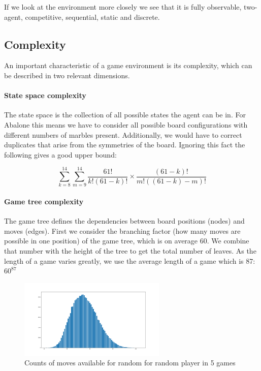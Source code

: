 \documentclass{llncs}
\begin{document}
If we look at the environment more closely we see that it is fully observable, two-agent, competitive, sequential, static and discrete.

\subsection{Complexity}
An important characteristic of a game environment is its complexity, which can be described in two relevant dimensions.

\paragraph{State space complexity}

The state space is the collection of all possible states the agent can be in.\cite[p. 150]{russell_artificial_2021} For Abalone this means we have to consider all possible board configurations with different numbers of marbles present. Additionally, we would have to correct duplicates that arise from the symmetries of the board. Ignoring this fact the following gives a good upper bound:

$$
  \sum_{k=8}^{14}\sum_{m=9}^{14}\frac{61!}{k!(61-k)!}\times\frac{(61-k)!}{m!((61-k)-m)!}
$$

\paragraph{Game tree complexity} The game tree defines the dependencies between board positions (nodes) and moves (edges). First we consider the branching factor (how many moves are possible in one position) of the game tree, which is on average 60. We combine that number with the height of the tree to get the total number of leaves. As the length of a game varies greatly, we use the average length of a game which is 87: $60^{87}$ \cite{lemmens_constructing_2005}

\begin{figure}
  \centering
  \includegraphics[width=7cm, keepaspectratio]{distribution_of_moves.png}
  \caption{Counts of moves available for random for random player in 5 games}
\end{figure}
\end{document}
